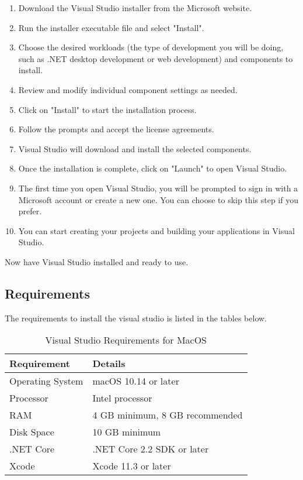 \begin{enumerate}
	\item  Download the Visual Studio installer from the Microsoft website.
	\item Run the installer executable file and select "Install".
	\item Choose the desired workloads (the type of development you will be doing, such as .NET desktop development or web development) and components to install.
	\item Review and modify individual component settings as needed. 
	\item Click on "Install" to start the installation process.
	\item Follow the prompts and accept the license agreements.
	\item Visual Studio will download and install the selected components.
	\item Once the installation is complete, click on "Launch" to open Visual Studio.
	\item The first time you open Visual Studio, you will be prompted to sign in with a Microsoft account or create a new one. You can choose to skip this step if you prefer.
	\item You can start creating your projects and building your applications in Visual Studio.
\end{enumerate}

Now have Visual Studio installed and ready to use.

\bigskip
\pagebreak

\subsection{Requirements}

The requirements to install the visual studio is  listed in the tables below.

\begin{table}[h]
	\centering
	\caption{Visual Studio Requirements for MacOS}
	\label{tab:macos}
	\begin{tabular}{@{}ll@{}}
		\toprule
		Requirement & Details \\
		\midrule
		Operating System & macOS 10.14 or later \\
		Processor & Intel processor \\
		RAM & 4 GB minimum, 8 GB recommended \\
		Disk Space & 10 GB minimum \\
		.NET Core & .NET Core 2.2 SDK or later \\
		Xcode & Xcode 11.3 or later \\
		\bottomrule
	\end{tabular}
\end{table}


